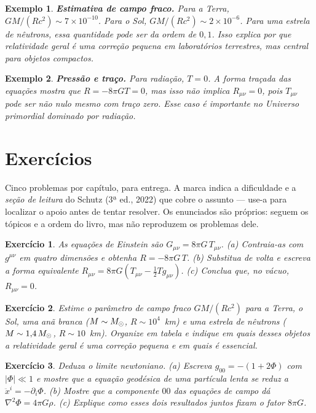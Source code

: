 \documentclass[12pt,a4paper,oneside]{book}
\theoremstyle{rgplain}
\newtheorem{example}{Exemplo}[chapter]
\newtheorem{exercise}{Exercício}[chapter]
\theoremstyle{rgremark}
\begin{document}
\begin{example}
\textbf{Estimativa de campo fraco.} Para a Terra,
$GM/(Rc^2)\sim7\times10^{-10}$. Para o Sol,
$GM/(Rc^2)\sim2\times10^{-6}$. Para uma estrela de nêutrons, essa quantidade
pode ser da ordem de $0{,}1$. Isso explica por que relatividade geral é uma
correção pequena em laboratórios terrestres, mas central para objetos compactos.
\end{example}

\begin{example}
\textbf{Pressão e traço.} Para radiação, $T=0$. A forma traçada das equações
mostra que $R=-8\pi GT=0$, mas isso não implica $R_{\mu\nu}=0$, pois
$T_{\mu\nu}$ pode ser não nulo mesmo com traço zero. Esse caso é importante no
Universo primordial dominado por radiação.
\end{example}

\clearpage
\section{Exercícios}
\begin{leitura}
Cinco problemas por capítulo, para entrega. A marca indica a dificuldade e a \emph{seção de leitura} do Schutz (3ª ed., 2022) que cobre o assunto --- use-a para localizar o apoio antes de tentar resolver. Os enunciados são próprios: seguem os tópicos e a ordem do livro, mas não reproduzem os problemas dele.
\end{leitura}

\begin{exercise}
As equações de Einstein são $G_{\mu\nu}=8\pi G\,T_{\mu\nu}$.
(a) Contraia-as com $g^{\mu\nu}$ em quatro dimensões e obtenha
$R=-8\pi G\,T$. (b) Substitua de volta e escreva a forma equivalente
$R_{\mu\nu}=8\pi G(T_{\mu\nu}-\tfrac12 T g_{\mu\nu})$. (c) Conclua que, no
vácuo, $R_{\mu\nu}=0$.
\end{exercise}

\begin{exercise}
Estime o parâmetro de campo fraco $GM/(Rc^2)$ para a Terra, o Sol, uma anã
branca ($M\sim M_\odot$, $R\sim10^4$~km) e uma estrela de nêutrons
($M\sim1{,}4\,M_\odot$, $R\sim10$~km). Organize em tabela e indique em quais
desses objetos a relatividade geral é uma correção pequena e em quais é
essencial.
\end{exercise}

\begin{exercise}
Deduza o limite newtoniano. (a) Escreva $g_{00}=-(1+2\Phi)$ com
$|\Phi|\ll1$ e mostre que a equação geodésica de uma partícula lenta se reduz
a $\ddot x^i=-\partial_i\Phi$. (b) Mostre que a componente $00$ das equações
de campo dá $\nabla^2\Phi=4\pi G\rho$. (c) Explique como esses dois resultados
juntos fixam o fator $8\pi G$.
\end{exercise}
\end{document}
